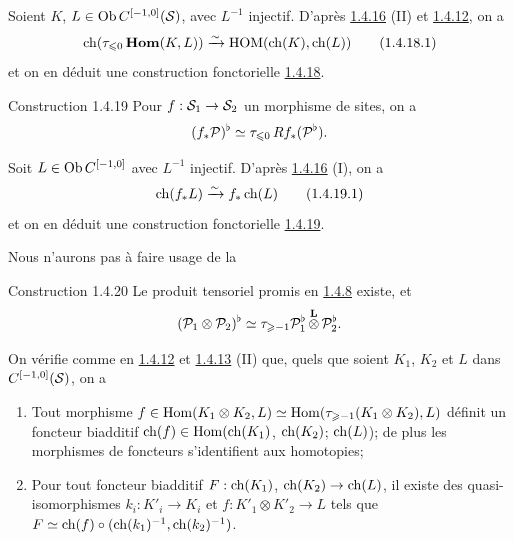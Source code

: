 \documentclass[10pt]{../fichiers-configuration-latex/smfart}
\begin{document}
Soient $K$, $L\in \operatorname{Ob} C^{[-1,0]}({\mathcal S})$, avec $L^{-1}$ injectif. D'après
\hyperref[XVIII.lem1.4.16]{1.4.16} (II) et \hyperref[XVIII.subsubsec1.4.12]{1.4.12}, on a
\begin{equation*}
\operatorname{ch}(\tau_{\leqslant
0}\operatorname{\mathbf{Hom}}(K,L))\xrightarrow{\sim}\operatorname{HOM}(\operatorname{ch}(K),\operatorname{ch}(L))\tag{1.4.18.1}
\end{equation*}%
et on en déduit une construction fonctorielle \hyperref[XVIII.const1.4.18]{1.4.18}.

\begin{enonce*}[remark]{Construction 1.4.19}
Pour $f:\Ss_{1}\to\Ss_{2}$ un morphisme de sites, on a
$$
(f_{\ast}{\mathcal P})^{\flat}\simeq \tau_{\leqslant
0}\,Rf_{\ast}({\mathcal P}^{\flat}){}.
$$
\end{enonce*}

Soit $L\in \operatorname{Ob} C^{[-1,0]}$ avec $L^{-1}$ injectif. D'après
\hyperref[XVIII.lem1.4.16]{1.4.16} (I), on a 
\begin{equation*}
\operatorname{ch}(f_{\ast}L)\xrightarrow{\sim} f_{\ast}\operatorname{ch}(L)\tag{1.4.19.1}
\end{equation*}%
et on en déduit une construction fonctorielle \hyperref[XVIII.const1.4.19]{1.4.19}.

Nous n'aurons pas à faire usage de la

\begin{enonce*}[remark]{Construction 1.4.20}
Le produit tensoriel promis en \hyperref[XVIII.subsubsec1.4.8]{1.4.8} existe, et
$$
({\mathcal P}_{1}\otimes {\mathcal P}_{2})^{\flat}\simeq \tau_{\geqslant
-1}{\mathcal P}^{\flat}_{1}\mathop{\otimes}^{\mathbf{L}}{\mathcal P}^{\flat}_{2}{}.
$$
\end{enonce*}

On vérifie comme en \hyperref[XVIII.subsubsec1.4.12]{1.4.12} et
\hyperref[XVIII.lem1.4.13]{1.4.13} (II) que, quels que soient 
$K_{1}$, $K_{2}$ et $L$ dans $C^{[-1,0]}({\mathcal S})$, on a
\begin{enumerate}
\renewcommand{\theenumi}{\alph{enumi}}
\renewcommand{\labelenumi}{(\theenumi)}
\item Tout morphisme $f\in \operatorname{Hom}(K_{1}\otimes K_{2},L)\simeq
\operatorname{Hom}(\tau_{\geqslant-1}(K_{1}\otimes K_{2}),L)$ définit un foncteur
biadditif $\operatorname{ch}(f)\in \operatorname{Hom}(\operatorname{ch}(K_{1})$, $\operatorname{ch}(K_{2})$; $\operatorname{ch}(L)$); de
plus les morphismes de foncteurs s'identifient aux homotopies;

\item Pour tout foncteur biadditif $F:\operatorname{ch}(K_{1})$,
$\operatorname{ch}(K_{2})\rightarrow \operatorname{ch}(L)$, il existe des quasi-isomorphismes
$k_{i}:K'_{i}\rightarrow K_{i}$ et $f:K'_{1}\otimes
K'_{2}\rightarrow L$ tels que $F\simeq \operatorname{ch}(f)\circ
(\operatorname{ch}(k_{1})^{-1},\operatorname{ch}(k_{2})^{-1})$.
\end{enumerate}
\end{document}
